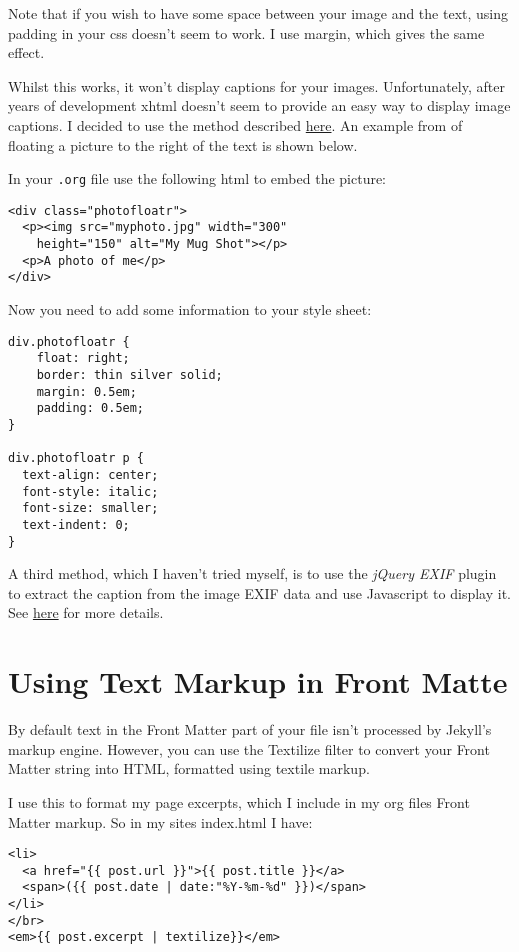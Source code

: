 \documentclass{article}
\begin{document}
Note that if you wish to have some space between your image and the
text, using padding in your css doesn't seem to work. I use margin,
which gives the same effect.

Whilst this works, it won't display captions for your images.
Unfortunately, after years of development xhtml doesn't seem to provide
an easy way to display image captions. I decided to use the method
described \href{http://www.w3.org/Style/Examples/007/figures}{here}. An
example from of floating a picture to the right of the text is shown
below.

In your \texttt{.org} file use the following html to embed the picture:


\begin{verbatim}
<div class="photofloatr">
  <p><img src="myphoto.jpg" width="300"
    height="150" alt="My Mug Shot"></p>
  <p>A photo of me</p>
</div>
\end{verbatim}

Now you need to add some information to your style sheet:


\begin{verbatim}
div.photofloatr {
    float: right;
    border: thin silver solid;
    margin: 0.5em;
    padding: 0.5em;
}

div.photofloatr p {
  text-align: center;
  font-style: italic;
  font-size: smaller;
  text-indent: 0;
}
\end{verbatim}

A third method, which I haven't tried myself, is to use the \emph{jQuery EXIF} plugin to extract the caption from the image EXIF data and use
Javascript to display it. See
\href{http://www.nihilogic.dk/labs/exif/}{here} for more details.
\section{Using Text Markup in Front Matte}
\label{sec-8}


By default text in the Front Matter part of your file isn't processed by
Jekyll's markup engine. However, you can use the Textilize filter to
convert your Front Matter string into HTML, formatted using textile
markup.

I use this to format my page excerpts, which I include in my org files
Front Matter markup. So in my sites index.html I have:


\begin{verbatim}
<li>
  <a href="{{ post.url }}">{{ post.title }}</a>
  <span>({{ post.date | date:"%Y-%m-%d" }})</span>
</li>
</br>
<em>{{ post.excerpt | textilize}}</em>
\end{verbatim}
\end{document}
